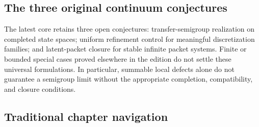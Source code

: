 \subsection{The three original continuum conjectures}
The latest core retains three open conjectures: transfer-semigroup realization on completed state spaces; uniform refinement control for meaningful discretization families; and latent-packet closure for stable infinite packet systems. Finite or bounded special cases proved elsewhere in the edition do not settle these universal formulations. In particular, summable local defects alone do not guarantee a semigroup limit without the appropriate completion, compatibility, and closure conditions.

\subsection{Traditional chapter navigation}

